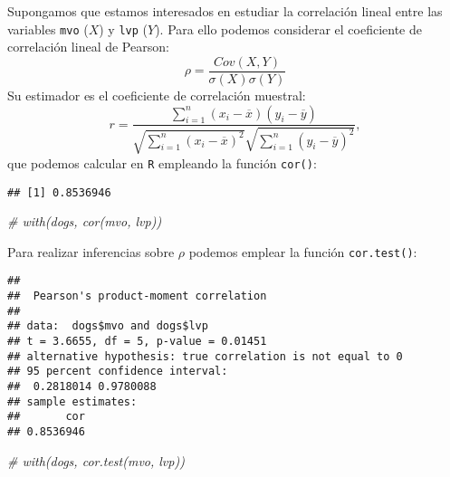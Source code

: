 \documentclass[
]{book}
\newenvironment{Shaded}{\begin{snugshade}}{\end{snugshade}}
\newcommand{\CommentTok}[1]{\textcolor[rgb]{0.56,0.35,0.01}{\textit{#1}}}
\newcommand{\FunctionTok}[1]{\textcolor[rgb]{0.00,0.00,0.00}{#1}}
\newcommand{\NormalTok}[1]{#1}
\newcommand{\SpecialCharTok}[1]{\textcolor[rgb]{0.00,0.00,0.00}{#1}}
\theoremstyle{break}
\theoremstyle{definition}
\theoremstyle{definition}
\theoremstyle{definition}
\theoremstyle{definition}
\theoremstyle{remark}
\begin{document}
Supongamos que estamos interesados en estudiar la correlación lineal
entre las variables \texttt{mvo} (\(X\)) y \texttt{lvp} (\(Y\)).
Para ello podemos considerar el coeficiente de correlación lineal de Pearson:
\[\rho =\frac{ Cov \left( X, Y \right) }
{ \sigma \left( X \right) \sigma \left( Y \right) }\]
Su estimador es el coeficiente de correlación muestral:
\[r=\frac{\sum_{i=1}^{n}(x_i-\overline{x})(y_i-\overline{y})}
{\sqrt{ \sum_{i=1}^{n}(x_i-\overline{x})^{2}} 
\sqrt{\sum_{i=1}^{n}(y_i-\overline{y})^{2}}},\]
que podemos calcular en \texttt{R} empleando la función \texttt{cor()}:

\begin{Shaded}
\end{Shaded}

\begin{verbatim}
## [1] 0.8536946
\end{verbatim}

\begin{Shaded}
\begin{Highlighting}[]
\CommentTok{\# with(dogs, cor(mvo, lvp))}
\end{Highlighting}
\end{Shaded}

Para realizar inferencias sobre \(\rho\) podemos emplear la función
\texttt{cor.test()}:

\begin{Shaded}
\end{Shaded}

\begin{verbatim}
## 
##  Pearson's product-moment correlation
## 
## data:  dogs$mvo and dogs$lvp
## t = 3.6655, df = 5, p-value = 0.01451
## alternative hypothesis: true correlation is not equal to 0
## 95 percent confidence interval:
##  0.2818014 0.9780088
## sample estimates:
##       cor 
## 0.8536946
\end{verbatim}

\begin{Shaded}
\begin{Highlighting}[]
\CommentTok{\# with(dogs, cor.test(mvo, lvp))}
\end{Highlighting}
\end{Shaded}
\end{document}
